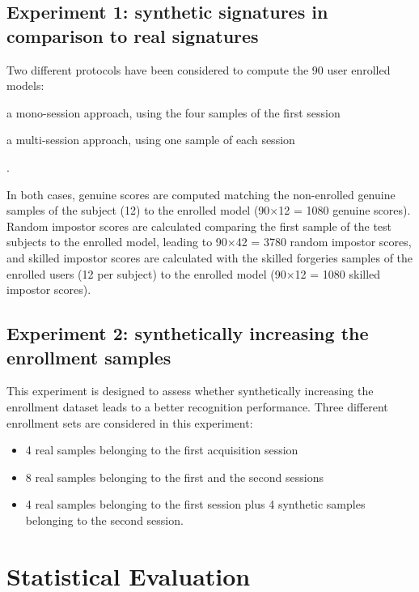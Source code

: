 \subsection{Experiment 1: synthetic signatures in comparison to real signatures}

Two different protocols have been considered to
compute the 90 user enrolled models:
\begin{inlinelist}
  \item a mono-session approach, using the four samples of the first session
  \item a multi-session approach, using one sample of  each session 
\end{inlinelist}.

In both cases, genuine scores are computed matching the non-enrolled genuine samples of the subject (12) to the enrolled model (90×12 = 1080 genuine scores). Random impostor scores are calculated comparing the first sample of the test subjects to the
enrolled model, leading to 90×42 = 3780 random impostor scores, and skilled impostor scores are calculated with the skilled forgeries samples of the enrolled users
(12 per subject) to the enrolled model (90×12 = 1080 skilled impostor scores).

\subsection{Experiment 2: synthetically increasing the enrollment samples}

This experiment is designed to assess whether synthetically increasing the enrollment dataset leads to a better recognition performance. Three different enrollment sets are considered in this experiment: 
\begin{itemize}
  \item 4 real samples belonging to the
  first acquisition session
  \item 8 real samples belonging to the first and
  the second sessions
  \item 4 real samples belonging
  to the first session plus 4 synthetic samples belonging
  to the second session.
\end{itemize}

\section{Statistical Evaluation}